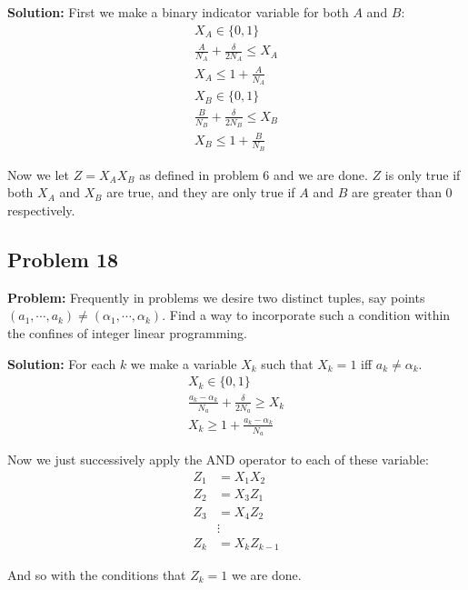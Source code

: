 \documentclass{article}
\begin{document}
\noindent\textbf{Solution:} First we make a binary indicator variable for both $A$ and $B$:
\begin{align*}
    X_A\in\{0,1\}\\
    \frac{A}{N_A}+\frac{\delta}{2N_A}\le X_A\\
    X_A\le 1+\frac{A}{N_A}
\end{align*}
\begin{align*}
    X_B\in\{0,1\}\\
    \frac{B}{N_B}+\frac{\delta}{2N_B}\le X_B\\
    X_B\le 1+\frac{B}{N_B}
\end{align*}

Now we let $Z=X_AX_B$ as defined in problem 6 and we are done. $Z$ is only true if both $X_A$ and $X_B$ are true, and they are only true if $A$ and $B$ are greater than 0 respectively.

\subsection*{Problem 18}
\noindent\textbf{Problem:} Frequently in problems we desire two distinct tuples, say points $(a_1,\cdots,a_k) \not= (\alpha_1,\cdots,\alpha_k)$. Find a way to incorporate such a condition within the confines of integer linear programming.
\bigskip

\noindent\textbf{Solution:} For each $k$ we make a variable $X_k$ such that $X_k=1$ iff $a_k\not=\alpha_k$.
\begin{align*}
    X_k\in\{0,1\}\\
    \frac{a_k-\alpha_k}{N_a}+\frac{\delta}{2N_a}\ge X_k\\
    X_k\ge 1+\frac{a_k-\alpha_k}{N_a}
\end{align*}

Now we just successively apply the AND operator to each of these variable:
\begin{align*}
    Z_1&=X_1X_2\\
    Z_2&=X_3Z_1\\
    Z_3&=X_4Z_2\\
    &\vdots\\
    Z_k&=X_kZ_{k-1}
\end{align*}

And so with the conditions that $Z_k=1$ we are done.
\end{document}
